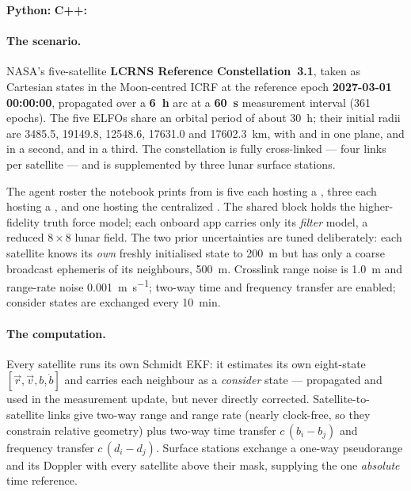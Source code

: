 \textbf{Python:}  \quad
\textbf{C++:} 

\paragraph{The scenario.}
NASA's five-satellite \textbf{LCRNS Reference Constellation~3.1}, taken as
Cartesian states in the Moon-centred ICRF at the reference epoch
\textbf{2027-03-01 00:00:00}, propagated over a \textbf{\SI{6}{\hour}} arc at a
\textbf{\SI{60}{\second}} measurement interval (361 epochs). The five ELFOs share
an orbital period of about \SI{30}{\hour}; their initial radii are
\SI{3485.5}{}, \SI{19149.8}{}, \SI{12548.6}{}, \SI{17631.0}{} and
\SI{17602.3}{\kilo\meter}, with  and  in one plane,
 and  in a second, and  in a third. The
constellation is fully cross-linked --- four links per satellite --- and is
supplemented by three lunar surface stations.

The agent roster the notebook prints from 
is five  each hosting a , three
 each hosting a , and one
 hosting the centralized . The
shared  block holds the higher-fidelity truth force model; each
onboard app carries only its \emph{filter} model, a reduced $8\times8$ lunar
field. The two prior uncertainties are tuned deliberately: each satellite knows
its \emph{own} freshly initialised state to \SI{200}{\meter} but has only a
coarse broadcast ephemeris of its neighbours, \SI{500}{\meter}. Crosslink range
noise is \SI{1.0}{\meter} and range-rate noise
\SI{0.001}{\meter\per\second}; two-way time and frequency transfer are enabled;
consider states are exchanged every \SI{10}{\minute}.

\paragraph{The computation.}
Every satellite runs its own Schmidt EKF: it estimates its own eight-state
$[\vec{r},\vec{v},b,\dot b]$ and carries each neighbour as a \emph{consider}
state --- propagated and used in the measurement update, but never directly
corrected. Satellite-to-satellite links give two-way range and range rate (nearly
clock-free, so they constrain relative geometry) plus two-way time transfer
$c\,(b_i-b_j)$ and frequency transfer $c\,(d_i-d_j)$. Surface stations exchange a
one-way pseudorange and its Doppler with every satellite above their mask,
supplying the one \emph{absolute} time reference.

